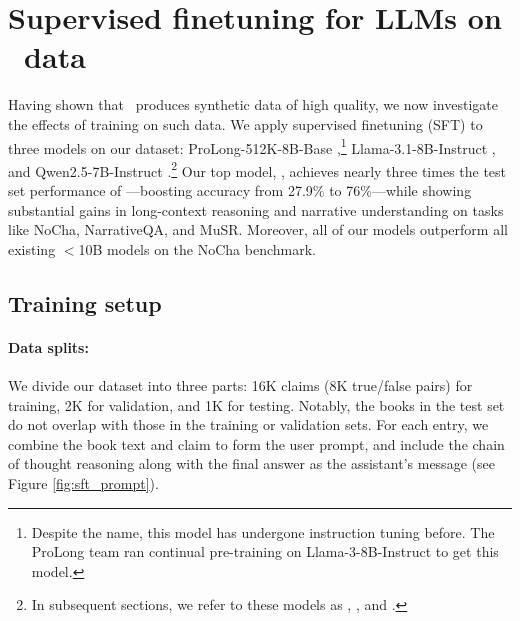 \section{Supervised finetuning for LLMs on \pipeline\ data}
\label{sec:training}
Having shown that \pipeline\ produces synthetic data of high quality, we now investigate the effects of training on such data. We apply supervised finetuning (SFT) to three models on our dataset: ProLong-512K-8B-Base \cite{gao2024trainlongcontextlanguagemodels},\footnote{Despite the name, this model has undergone instruction tuning before. The ProLong team ran continual pre-training on Llama-3-8B-Instruct to get this model.} Llama-3.1-8B-Instruct \cite{dubey2024llama}, and Qwen2.5-7B-Instruct \cite{qwen2.5}.\footnote{In subsequent sections, we refer to these models as \prolongbase, \llamainst, and \qweninst.} Our top model, \llamaft, achieves nearly three times the test set performance of \llamainst—boosting accuracy from 27.9\% to 76\%—while showing substantial gains in long-context reasoning and narrative understanding on tasks like NoCha, NarrativeQA, and MuSR. Moreover, all of our models outperform all existing $<$10B models on the NoCha benchmark.


\subsection{Training setup}

\paragraph{Data splits:} We divide our dataset into three parts: 16K claims (8K true/false pairs) for training, 2K for validation, and 1K for testing. Notably, the books in the test set do not overlap with those in the training or validation sets. For each entry, we combine the book text and claim to form the user prompt, and include the chain of thought reasoning along with the final answer as the assistant’s message (see Figure \ref{fig:sft_prompt}). %

